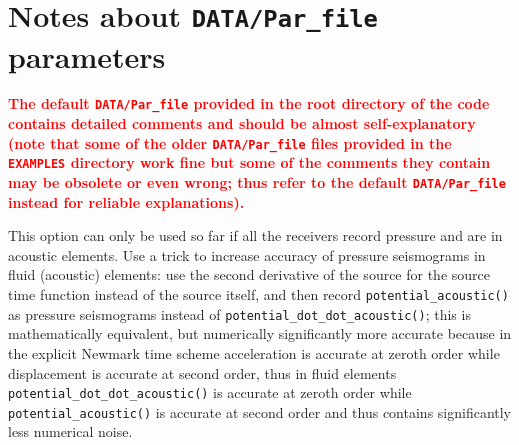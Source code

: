 \documentclass[oneside,english,onecolumn,letterpaper]{book}
\newcommand{\red}[1]{\textbf{\textcolor{Red}{#1}}}
\begin{document}
\section*{Notes about \texttt{DATA/Par\_file} parameters}

\red{\textbf{The default \texttt{DATA/Par\_file} provided in the root directory of the code contains detailed comments and should be almost self-explanatory
(note that some of the older \texttt{DATA/Par\_file} files provided in the \texttt{EXAMPLES} directory work fine but some of the comments
they contain may be obsolete or even wrong; thus refer to the default \texttt{DATA/Par\_file} instead for reliable explanations).}}

\begin{description}[font=\ttfamily]

\item[USE\_TRICK\_FOR\_BETTER\_PRESSURE]

This option can only be used so far if all the receivers record pressure and are in acoustic elements.
Use a trick to increase accuracy of pressure seismograms in fluid (acoustic) elements:
use the second derivative of the source for the source time function instead of the source itself,
and then record \texttt{potential\_acoustic()} as pressure seismograms instead of \texttt{potential\_dot\_dot\_acoustic()};
this is mathematically equivalent, but numerically significantly more accurate because in the explicit
Newmark time scheme acceleration is accurate at zeroth order while displacement is accurate at second order,
thus in fluid elements \texttt{potential\_dot\_dot\_acoustic()} is accurate at zeroth order while \texttt{potential\_acoustic()}
is accurate at second order and thus contains significantly less numerical noise.




\end{description}
\end{document}
